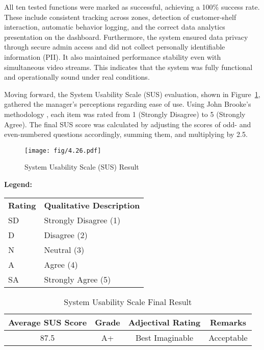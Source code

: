 {All ten tested functions were marked as successful, achieving a 100\% success rate. These include consistent tracking across zones, detection of customer-shelf interaction, automatic behavior logging, and the correct data analytics presentation on the dashboard. Furthermore, the system ensured data privacy through secure admin access and did not collect personally identifiable information (PII). It also maintained performance stability even with simultaneous video streams. This indicates that the system was fully functional and operationally sound under real conditions.

Moving forward, the System Usability Scale (SUS) evaluation, shown in Figure~\ref{fig:4.26}, gathered the manager’s perceptions regarding ease of use. Using John Brooke’s methodology \citep{Carden2025}, each item was rated from 1 (Strongly Disagree) to 5 (Strongly Agree). The final SUS score was calculated by adjusting the scores of odd- and even-numbered questions accordingly, summing them, and multiplying by 2.5.

\begin{figure}[H]
	\caption[System Usability Scale (SUS) Result]{\newline \newline System Usability Scale (SUS) Result}
	\centering
	\texttt{[image: fig/4.26.pdf]}
	\label{fig:4.26}
\end{figure}

\noindent\textbf{Legend:}

\begin{tabular}{ll}
	\centering
	\textbf{Rating} & \textbf{Qualitative Description} \\
	SD & Strongly Disagree (1) \\
	D & Disagree (2) \\
	N & Neutral (3) \\
	A & Agree (4) \\
	SA & Strongly Agree (5) \\
\end{tabular}

\begin{table}[H]
	\centering
	\caption[System Usability Scale Final Result]{\newline \newline System Usability Scale Final Result}
	\label{tab:sus-result}
	\begin{tabular}{|c|c|c|c|}
		\hline
		\textbf{Average SUS Score} & \textbf{Grade} & \textbf{Adjectival Rating} & \textbf{Remarks} \\
		\hline
		87.5 & A+ & Best Imaginable & Acceptable \\
		\hline
	\end{tabular}
\end{table}

}
